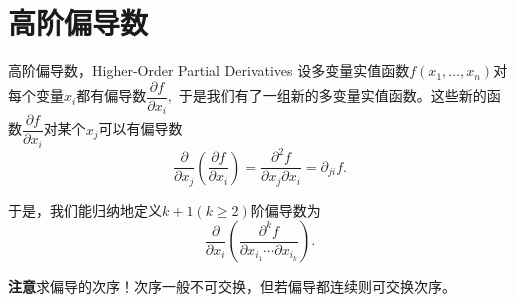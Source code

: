 
\section{高阶偏导数}


\begin{frame}

\begin{block}{高阶偏导数，Higher-Order Partial Derivatives}
设多变量实值函数$f(x_1,\ldots,x_n)$对每个变量$x_i$都有偏导数$\dfrac{\partial f}{\partial x_i},$ 于是我们有了一组新的多变量实值函数。这些新的函数$\dfrac{\partial f}{\partial x_i}$对某个$x_j$可以有偏导数
$$\dfrac{\partial}{\partial x_j}\left( \dfrac{\partial f}{\partial x_i} \right) = \dfrac{\partial^2 f}{\partial x_j \partial x_i} = \partial_{ji}f.$$

\pause

于是，我们能归纳地定义$k+1(k\geqslant2)$阶偏导数为
$$\dfrac{\partial}{\partial x_i}\left( \dfrac{\partial^k f}{\partial x_{i_1} \cdots \partial x_{i_k}} \right).$$
\end{block}

\pause

{\bfseries 注意}求偏导的次序！次序一般不可交换，但若偏导都连续则可交换次序。

\end{frame}















